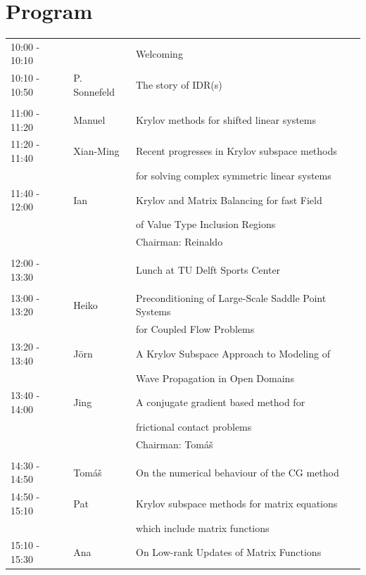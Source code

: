 \documentclass{article}
\begin{document}
\section*{Program}
\begin{table}[h]
\begin{tabular}{lll}
10:00 - 10:10 &  & Welcoming \\ [0.5ex]
10:10 - 10:50 & P. Sonnefeld & The story of IDR(s) \\ [0.5ex]
\hline \\ [-1.5ex]
11:00 - 11:20 & Manuel & Krylov methods for shifted linear systems \\ [0.5ex]
11:20 - 11:40 & Xian-Ming & Recent progresses in Krylov subspace methods\\ 
                        & & for solving complex symmetric linear systems\\  [0.5ex]
11:40 - 12:00 & Ian & Krylov and Matrix Balancing for fast Field \\ 
              &     & of Value Type Inclusion Regions\\  [0.5ex]
& & \hfill \small{Chairman: Reinaldo }  \\
\hline \\ [-1.5ex]
12:00 - 13:30 & & Lunch at TU Delft Sports Center \\ [0.5ex]
\hline \\ [-1.5ex]
13:00 - 13:20 & Heiko & Preconditioning of Large-Scale Saddle Point Systems\\
                    & & for Coupled Flow Problems\\ [0.5ex]
13:20 - 13:40 &J\"orn & A Krylov Subspace Approach to Modeling of \\
                     & & Wave Propagation in Open Domains\\ [0.5ex]
13:40 - 14:00 & Jing & A conjugate gradient based method for \\
                   & & frictional contact problems\\ [0.5ex]
& & \hfill \small{Chairman: Tom{\'a}{\v s}} \\
\hline \\ [-1.5ex]
14:30 - 14:50 & Tom{\'a}{\v s} & On the numerical behaviour of the CG method\\ [0.5ex]
14:50 - 15:10 & Pat & Krylov subspace methods for matrix equations \\
                  & & which include matrix functions\\ [0.5ex]
15:10 - 15:30 & Ana & On Low-rank Updates of Matrix Functions\\ [0.5ex]

\end{tabular}
\end{table}
\end{document}
